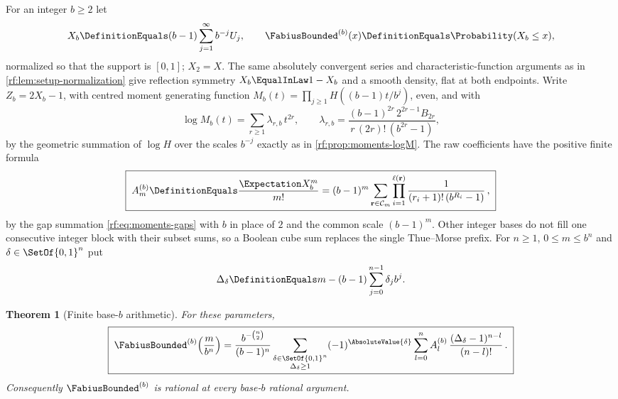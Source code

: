 \documentclass[11pt,oneside]{article}
\theoremstyle{plain}
\newtheorem{theorem}{Theorem}[section]
\theoremstyle{definition}
\theoremstyle{remark}
\newcommand{\Fb}{\FabiusBounded}            %
\newcommand{\E}{\Expectation}
\newcommand{\Prob}{\Probability}
\newcommand{\Comp}[1]{\mathcal{C}_{#1}}     %
\begin{document}
For an integer $b\ge2$ let
\begin{equation}
 X_{b}\DefinitionEquals(b-1)\sum_{j=1}^{\infty}b^{-j}U_{j},\qquad
 \Fb^{(b)}(x)\DefinitionEquals\Prob(X_{b}\le x),
 \label{rf:eq:base-X}
\end{equation}
normalized so that the support is $[0,1]$; $X_{2}=X$.  The same
absolutely convergent series and characteristic-function arguments as in
\cref{rf:lem:setup-normalization} give reflection symmetry
$X_{b}\EqualInLaw1-X_{b}$ and a smooth density, flat at both endpoints.
Write $Z_{b}=2X_{b}-1$, with centred moment generating function
$M_{b}(t)=\prod_{j\ge1}H((b-1)t/b^{j})$, even, and with
\begin{equation}
 \log M_{b}(t)=\sum_{r\ge1}\lambda_{r,b}\,t^{2r},\qquad
 \lambda_{r,b}=\frac{(b-1)^{2r}\,2^{2r-1}B_{2r}}{r\,(2r)!\,(b^{2r}-1)},
 \label{rf:eq:base-lambda}
\end{equation}
by the geometric summation of $\log H$ over the scales $b^{-j}$ exactly as
in \cref{rf:prop:moments-logM}.  The raw coefficients have the positive
finite formula
\begin{equation}
 \boxed{\;
 A^{(b)}_{m}\DefinitionEquals\frac{\E X_{b}^{m}}{m!}
 =(b-1)^{m}\sum_{\mathbf r\in\Comp{m}}\prod_{i=1}^{\ell(\mathbf r)}
 \frac{1}{(r_{i}+1)!\,(b^{R_{i}}-1)}\,,\;}
 \label{rf:eq:base-A}
\end{equation}
by the gap summation \cref{rf:eq:moments-gaps} with $b$ in place of $2$ and
the common scale $(b-1)^{m}$.  Other integer bases do not fill one
consecutive integer block with their subset sums, so a Boolean cube sum
replaces the single Thue--Morse prefix.  For $n\ge1$, $0\le m\le b^{n}$ and
$\delta\in\SetOf{0,1}^{n}$ put
\begin{equation}
 \Delta_{\delta}\DefinitionEquals m-(b-1)\sum_{j=0}^{n-1}\delta_{j}b^{j}.
 \label{rf:eq:base-delta}
\end{equation}

\begin{theorem}[Finite base-$b$ arithmetic]
\label{rf:thm:base-arithmetic}
For these parameters,
\begin{equation}
 \boxed{\;
 \Fb^{(b)}\!\left(\frac{m}{b^{n}}\right)
 =\frac{b^{-\binom{n}{2}}}{(b-1)^{n}}
 \sum_{\substack{\delta\in\SetOf{0,1}^{n}\\ \Delta_{\delta}\ge1}}(-1)^{\AbsoluteValue{\delta}}
 \sum_{l=0}^{n}A^{(b)}_{l}\,\frac{(\Delta_{\delta}-1)^{n-l}}{(n-l)!}\,.\;}
 \label{rf:eq:base-value}
\end{equation}
Consequently $\Fb^{(b)}$ is rational at every base-$b$ rational argument.
\end{theorem}
\end{document}
